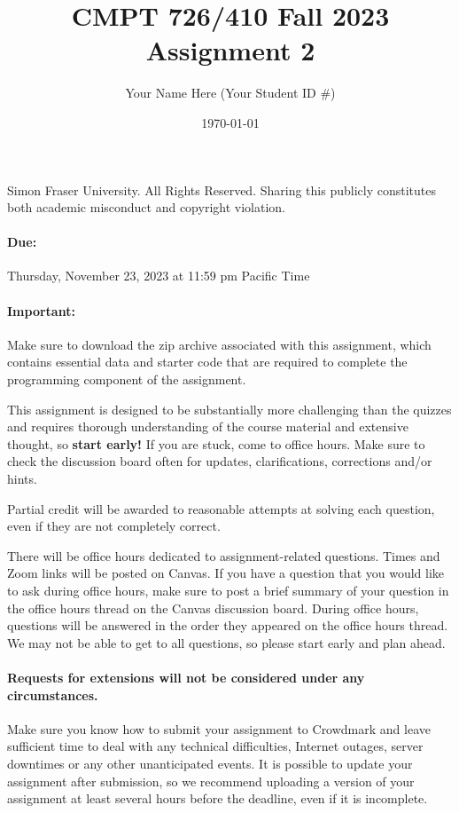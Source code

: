 \documentclass[10pt]{article}
\title{CMPT 726/410 Fall 2023 Assignment 2} %
\author{Your Name Here (Your Student ID \#)} %
\date{\today}
\begin{document}
\maketitle

\textcopyright Simon Fraser University. All Rights Reserved. Sharing this publicly constitutes both academic misconduct and copyright violation.


\paragraph{Due:} Thursday, November 23, 2023 at 11:59 pm Pacific Time

\paragraph{Important:} Make sure to download the zip archive associated with this assignment, which contains essential data and starter code that are required to complete the programming component of the assignment.

This assignment is designed to be substantially more challenging than the quizzes and requires thorough understanding of the course material and extensive thought, so \textbf{start early!} If you are stuck, come to office hours. Make sure to check the discussion board often for updates, clarifications, corrections and/or hints. 

Partial credit will be awarded to reasonable attempts at solving each question, even if they are not completely correct. 

There will be office hours dedicated to assignment-related questions. Times and Zoom links will be posted on Canvas. If you have a question that you would like to ask during office hours, make sure to post a brief summary of your question in the office hours thread on the Canvas discussion board. During office hours, questions will be answered in the order they appeared on the office hours thread. We may not be able to get to all questions, so please start early and plan ahead.

\paragraph{Requests for extensions will not be considered under any circumstances.}{Make sure you know how to submit your assignment to Crowdmark and leave sufficient time to deal with any technical difficulties, Internet outages, server downtimes or any other unanticipated events. It is possible to update your assignment after submission, so we recommend uploading a version of your assignment at least several hours before the deadline, even if it is incomplete.}
\end{document}
